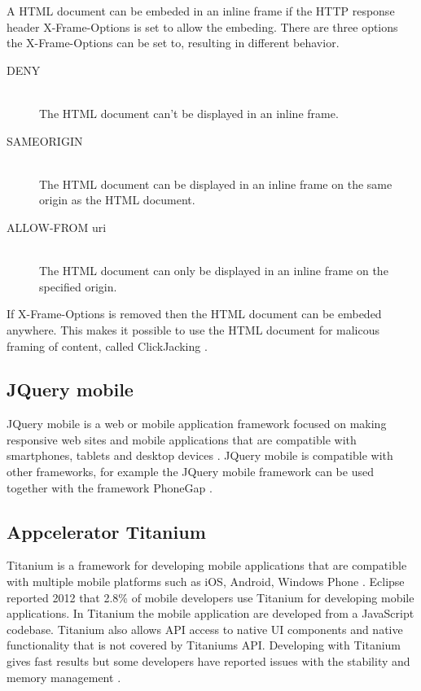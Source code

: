 A HTML document can be embeded in an inline frame if the HTTP response header X-Frame-Options is set to allow the embeding. There are three options the X-Frame-Options can be set to, resulting in different behavior. 
\begin{description}
 \item[DENY] \hfill \\
	The HTML document can't be displayed in an inline frame. 
\item[SAMEORIGIN] \hfill \\
	The HTML document can be displayed in an inline frame on the same origin as the HTML document. 
\item[ALLOW-FROM uri] \hfill \\
	The HTML document can only be displayed in an inline frame on the specified origin. 
\end{description}

If X-Frame-Options is removed then the HTML document can be embeded anywhere. This makes it possible to use the HTML document for malicous framing of content, called ClickJacking \cite{law2010}.

\subsection{JQuery mobile}\label{subsec:jquery-mobile}
JQuery mobile is a web or mobile application framework focused on making responsive web sites and mobile applications that are compatible with smartphones, tablets and desktop devices \cite{jquery-mobile15}. JQuery mobile is compatible with other frameworks, for example the JQuery mobile framework can be used together with the framework PhoneGap \cite{tech-republic-jquery-mobile-compatible14}. 

\subsection{Appcelerator Titanium}\label{subsec:appcelerator-titanium}
Titanium is a framework for developing mobile applications that are compatible with multiple mobile platforms such as iOS, Android, Windows Phone \cite{titanium15}. Eclipse reported 2012 that 2.8\% of mobile developers use Titanium for developing mobile applications. In Titanium the mobile application are developed from a JavaScript codebase. Titanium also allows API access to native UI components and native functionality that is not covered by Titaniums API. Developing with Titanium gives fast results but some developers have reported issues with the stability and memory management \cite{stay-away1-titanium15} \cite{stay-away2-titanium15}. 

